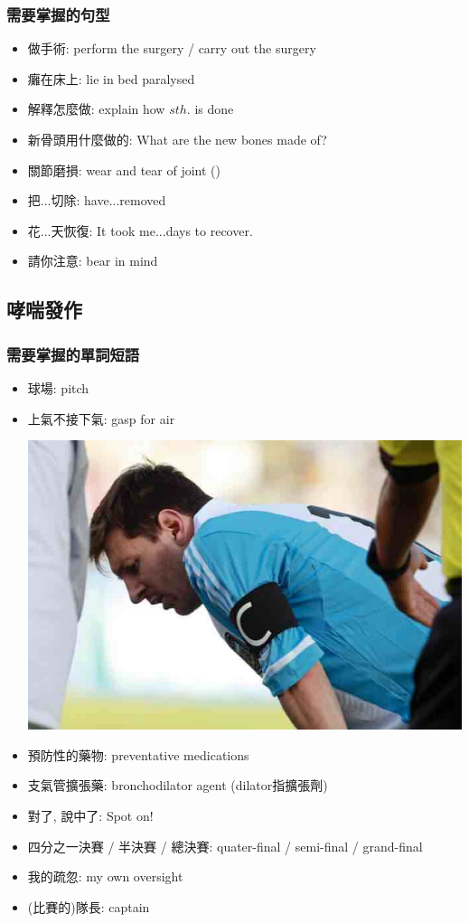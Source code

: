 \subsubsection*{需要掌握的句型}
\begin{itemize}
  \itemsep0em
  \item 做手術: perform the surgery / carry out the surgery
  \item 癱在床上: lie in bed paralysed
  \item 解釋怎麼做: explain how $sth.$ is done
  \item 新骨頭用什麼做的: What are the new bones made of?
  \item 關節磨損: wear and tear of joint ()
  \item 把...切除: have...removed
  \item 花...天恢復: It took me...days to recover.
  \item 請你注意: bear in mind
\end{itemize}

\subsection{哮喘發作}
\subsubsection*{需要掌握的單詞短語}
\begin{itemize}
  \itemsep0em
  \item 球場: pitch
  \item 上氣不接下氣: gasp for air
  \begin{center}
    \includegraphics[scale=.3]{pics/gasp-for-air.jpg}
  \end{center}
  \item 預防性的藥物: preventative medications
  \item 支氣管擴張藥: bronchodilator agent (dilator指擴張劑)
  \item 對了, 說中了: Spot on!
  \item 四分之一決賽 / 半決賽 / 總決賽: quater-final /  semi-final / grand-final
  \item 我的疏忽: my own oversight
  \item (比賽的)隊長: captain
\end{itemize}

